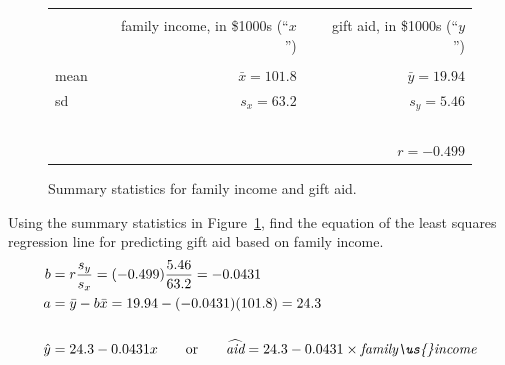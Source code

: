 \begin{figure}[ht]
\centering
\begin{tabular}{l rr}
\hline
\vspace{-4mm} & & \\
\vspace{0.4mm}	&	\ \ family income, in \$1000s (``$x$'')	& \ \ gift aid, in \$1000s (``$y$'') \\
\hline
  \vspace{-3.9mm} & & \\
mean	& $\bar{x} = 101.8$		& $\bar{y} = 19.94$ \\
sd		& $s_x = 63.2$		& $s_y = 5.46$\vspace{0.4mm} \\
\hline
\vspace{-4mm}\ &\\
	& \multicolumn{2}{r}{$r=-0.499$} \\
\hline
\end{tabular}
\caption{Summary statistics for family income and gift aid.}
\label{summaryStatsOfSATGPAData}
\end{figure}

\D{\newpage}
 
\begin{examplewrap}
\begin{nexample} 
{Using the summary statistics in Figure~\ref{summaryStatsOfSATGPAData}, find the equation of the least squares regression line for predicting gift aid based on family income.}
\begin{align*}
b &= r\frac{s_y}{s_x} = (-0.499)\frac{5.46}{63.2} = -0.0431 \\
a & = \bar{y} - b\bar{x} = 19.94 - (-0.0431)(101.8) = 24.3\\
\\
\hat{y}&=24.3 - 0.0431x
	\qquad\text{or}\qquad
	\widehat{\textit{aid}} = 24.3 - 0.0431\times \textit{family\us{}income}
\end{align*}
\end{nexample}
\end{examplewrap}
\label{findingTheSlopeOfTheLSRLineForIncomeAndAid}


